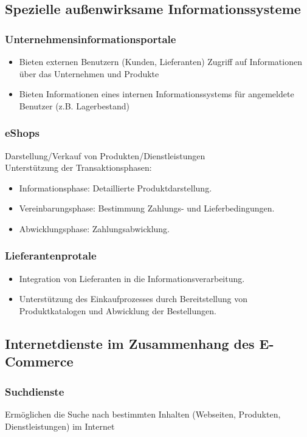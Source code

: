 \subsection{Spezielle außenwirksame Informationssysteme}
    \subsubsection*{Unternehmensinformationsportale}
        \begin{itemize}
            \item Bieten externen Benutzern (Kunden, Lieferanten) Zugriff auf Informationen über das Unternehmen und Produkte
            \item Bieten Informationen eines internen Informationssystems für angemeldete Benutzer (z.B. Lagerbestand)
        \end{itemize}
    \subsubsection*{eShops}
        Darstellung/Verkauf von Produkten/Dienstleistungen \\
        Unterstützung der Transaktionsphasen:
        \begin{itemize}
            \item Informationsphase: Detaillierte Produktdarstellung.
            \item Vereinbarungsphase: Bestimmung Zahlungs- und Lieferbedingungen.
            \item Abwicklungsphase: Zahlungsabwicklung.
        \end{itemize}
    \subsubsection*{Lieferantenprotale}
        \begin{itemize}
            \item Integration von Lieferanten in die Informationsverarbeitung.
            \item Unterstützung des Einkaufprozesses durch Bereitstellung von Produktkatalogen und Abwicklung der Bestellungen.
        \end{itemize}

\subsection{Internetdienste im Zusammenhang des E-Commerce}
    \subsubsection*{Suchdienste}
        Ermöglichen die Suche nach bestimmten Inhalten (Webseiten, Produkten, Dienstleistungen) im Internet

